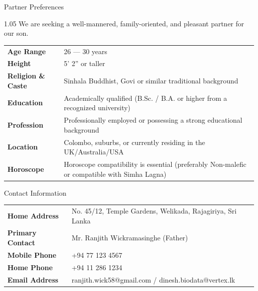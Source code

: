 \documentclass[11pt,a4paper]{article}
\begin{document}
\begin{biodatabox}{Partner Preferences}
  \begin{spacing}{1.05}
    We are seeking a well-mannered, family-oriented, and pleasant partner for our son.\par
    \vspace{4pt}
    \renewcommand{\arraystretch}{1.2}
    \begin{tabularx}{0.98\linewidth}{@{}l X@{}}
      \textbf{Age Range} & 26 --- 30 years \\
      \textbf{Height} & 5' 2'' or taller \\
      \textbf{Religion \& Caste} & Sinhala Buddhist, Govi or similar traditional background \\
      \textbf{Education} & Academically qualified (B.Sc. / B.A. or higher from a recognized university) \\
      \textbf{Profession} & Professionally employed or possessing a strong educational background \\
      \textbf{Location} & Colombo, suburbs, or currently residing in the UK/Australia/USA \\
      \textbf{Horoscope} & Horoscope compatibility is essential (preferably Non-malefic or compatible with Simha Lagna) \\
    \end{tabularx}
  \end{spacing}
\end{biodatabox}

\vspace{0.2cm}

\begin{biodatabox}{Contact Information}
  \renewcommand{\arraystretch}{1.2}
  \begin{tabularx}{0.98\linewidth}{@{}l X@{}}
    \textbf{Home Address} & No. 45/12, Temple Gardens, Welikada, Rajagiriya, Sri Lanka \\
    \textbf{Primary Contact} & Mr. Ranjith Wickramasinghe (Father) \\
    \textbf{Mobile Phone} & +94 77 123 4567 \\
    \textbf{Home Phone} & +94 11 286 1234 \\
    \textbf{Email Address} & ranjith.wick58@gmail.com / dinesh.biodata@vertex.lk \\
  \end{tabularx}
\end{biodatabox}
\end{document}
